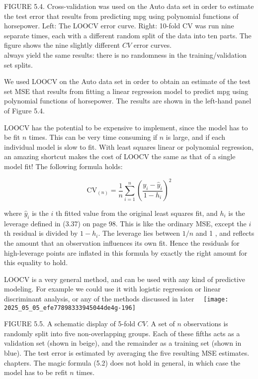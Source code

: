 \documentclass[10pt]{article}
\begin{document}
FIGURE 5.4. Cross-validation was used on the Auto data set in order to estimate the test error that results from predicting mpg using polynomial functions of horsepower. Left: The LOOCV error curve. Right: 10-fold CV was run nine separate times, each with a different random split of the data into ten parts. The figure shows the nine slightly different $C V$ error curves.\\
always yield the same results: there is no randomness in the training/validation set splits.

We used LOOCV on the Auto data set in order to obtain an estimate of the test set MSE that results from fitting a linear regression model to predict mpg using polynomial functions of horsepower. The results are shown in the left-hand panel of Figure 5.4.

LOOCV has the potential to be expensive to implement, since the model has to be fit $n$ times. This can be very time consuming if $n$ is large, and if each individual model is slow to fit. With least squares linear or polynomial regression, an amazing shortcut makes the cost of LOOCV the same as that of a single model fit! The following formula holds:


\begin{equation*}
\mathrm{CV}_{(n)}=\frac{1}{n} \sum_{i=1}^{n}\left(\frac{y_{i}-\hat{y}_{i}}{1-h_{i}}\right)^{2} \tag{5.2}
\end{equation*}


where $\hat{y}_{i}$ is the $i$ th fitted value from the original least squares fit, and $h_{i}$ is the leverage defined in (3.37) on page 98. This is like the ordinary MSE, except the $i$ th residual is divided by $1-h_{i}$. The leverage lies between $1 / n$ and 1 , and reflects the amount that an observation influences its own fit. Hence the residuals for high-leverage points are inflated in this formula by exactly the right amount for this equality to hold.

LOOCV is a very general method, and can be used with any kind of predictive modeling. For example we could use it with logistic regression or linear discriminant analysis, or any of the methods discussed in later\
\
\texttt{[image: 2025\_05\_05\_efe77898333945044de4g-196]}

FIGURE 5.5. A schematic display of 5-fold $C V$. A set of $n$ observations is randomly split into five non-overlapping groups. Each of these fifths acts as a validation set (shown in beige), and the remainder as a training set (shown in blue). The test error is estimated by averaging the five resulting MSE estimates.\\
chapters. The magic formula (5.2) does not hold in general, in which case the model has to be refit $n$ times.
\end{document}
